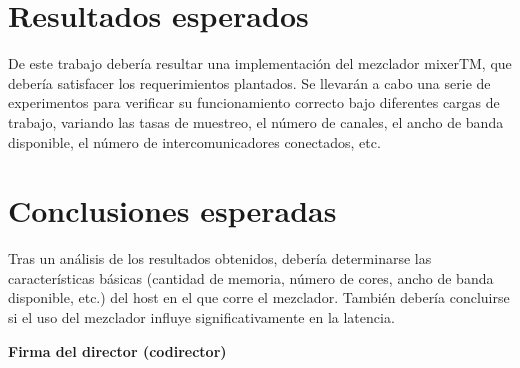 \documentclass[titlepage, 12pt, a4paper, oneside]{article}
\begin{document}
\section{Resultados esperados}
\label{sec:resultados}
De este trabajo debería resultar una implementación del mezclador
mixerTM, que debería satisfacer los requerimientos plantados. Se
llevarán a cabo una serie de experimentos para verificar su
funcionamiento correcto bajo diferentes cargas de trabajo, variando
las tasas de muestreo, el número de canales, el ancho de banda
disponible, el número de intercomunicadores conectados, etc.

\section{Conclusiones esperadas}
\label{sec:conclusiones}
Tras un análisis de los resultados obtenidos, debería determinarse las
características básicas (cantidad de memoria, número de cores, ancho
de banda disponible, etc.) del host en el que corre el
mezclador. También debería concluirse si el uso del mezclador influye
significativamente en la latencia.




\begin{center}
  \textbf{Firma del director (codirector)}
\end{center}
\end{document}

